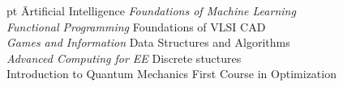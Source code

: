 \documentclass[a4paper,11pt]{article}
\newcommand{\isep}{-2 pt}
\begin{document}

\begin{tabbing}\itemsep \isep
        \hspace{1cm}\= Artificial Intelligence \hspace{3cm} \quad\= \emph{Foundations of Machine Learning} \\
                \> \emph{Functional Programming}  \>Foundations of VLSI CAD \\
                \> \emph{Games and Information}  \> Data Structures and Algorithms \\
                \>  \emph{Advanced Computing for EE} \>Discrete stuctures \\
                \>Introduction to Quantum Mechanics \> First Course in Optimization\\
 \end{tabbing}
\end{document}
